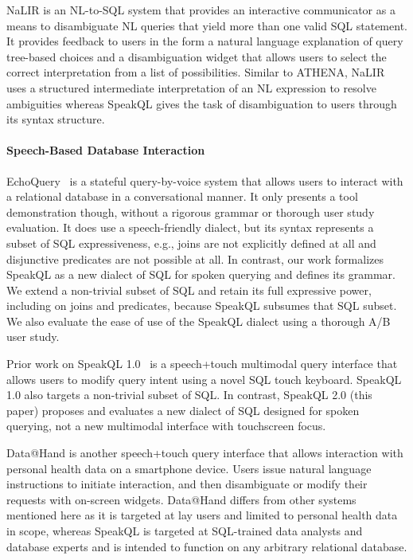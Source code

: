NaLIR \cite{10.14778/2735461.2735468} is an NL-to-SQL system that provides an interactive communicator as a means to disambiguate NL queries that yield more than one valid SQL statement. It provides feedback to users in the form a natural language explanation of query tree-based choices and a disambiguation widget that allows users to select the correct interpretation from a list of possibilities. Similar to ATHENA, NaLIR uses a structured intermediate interpretation of an NL expression to resolve ambiguities whereas SpeakQL gives the task of disambiguation to users through its syntax structure.

\paragraph{\textbf{Speech-Based Database Interaction}}
EchoQuery~\cite{Lyons2016} is a stateful query-by-voice system that allows users to interact with a relational database in a conversational manner. 
It only presents a tool demonstration though, without a rigorous grammar or thorough user study evaluation. 
It does use a speech-friendly dialect, but its syntax represents a subset of SQL expressiveness, e.g., joins are not explicitly defined at all and disjunctive predicates are not possible at all.
In contrast, our work formalizes SpeakQL as a new dialect of SQL for spoken querying and defines its grammar.
We extend a non-trivial subset of SQL and retain its full expressive power, including on joins and predicates, because SpeakQL subsumes that SQL subset.
We also evaluate the ease of use of the SpeakQL dialect using a thorough A/B user study. 

Prior work on SpeakQL 1.0~\cite{Shah2020} is a speech+touch multimodal query interface that allows users to modify query intent using a novel SQL touch keyboard. SpeakQL 1.0 also targets a non-trivial subset of SQL. In contrast, SpeakQL 2.0 (this paper) proposes and evaluates a new dialect of SQL designed for spoken querying, not a new multimodal interface with touchscreen focus.

Data@Hand \cite{10.1145/3411764.3445421} is another speech+touch query interface that allows interaction with personal health data on a smartphone device. Users issue natural language instructions to initiate interaction, and then disambiguate or modify their requests with on-screen widgets. Data@Hand differs from other systems mentioned here as it is targeted at lay users and limited to personal health data in scope, whereas SpeakQL is targeted at SQL-trained data analysts and database experts and is intended to function on any arbitrary relational database.

